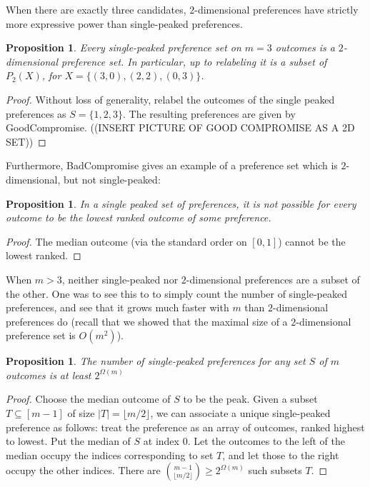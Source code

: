 \documentclass[12pt]{article}
\newtheorem{proposition}[theorem]{Proposition}
\newcommand{\1}[1]{\mathds{1}[{#1}]}
\begin{document}
  When there are exactly three candidates, $2$-dimensional
  preferences have strictly more expressive power than
  single-peaked preferences.
  \begin{proposition}
    Every single-peaked preference set on $m=3$ outcomes
    is a $2$-dimensional preference set. In particular,
    up to relabeling it is a subset of $P_2(X)$, for
    $X = \{ (3,0), (2,2), (0,3) \}$.
  \end{proposition}
  \begin{proof}
    Without loss of generality, relabel the outcomes
    of the single peaked preferences as $S = \{1,2,3\}$.
    The resulting preferences are given by {\sc GoodCompromise}.
    ((INSERT PICTURE OF GOOD COMPROMISE AS A 2D SET))
  \end{proof}
  Furthermore, {\sc BadCompromise} gives an example of a preference set
  which is $2$-dimensional, but not single-peaked:
  \begin{proposition} \label{prop:noLeastFavorite}
    In a single peaked set of preferences, it is not possible
    for every outcome to be the lowest ranked outcome of some preference.
  \end{proposition}
  \begin{proof}
    The median outcome (via the standard order on $[0,1]$)
    cannot be the lowest ranked.
  \end{proof}

  When $m>3$, neither single-peaked nor $2$-dimensional preferences
  are a subset of the other. One was to see this to to simply
  count the number of single-peaked preferences, and see that it
  grows much faster with $m$ than $2$-dimensional preferences do
  (recall that we showed that the maximal size of a $2$-dimensional
  preference set is $O(m^2)$).
  \begin{proposition}
    The number of single-peaked preferences for any set $S$ of $m$ outcomes
    is at least $2^{\Omega(m)}$
  \end{proposition}
  \begin{proof}
    Choose the median outcome of $S$ to be the peak.
    Given a subset $T\subseteq [m-1]$ of size $|T| = \lfloor m/2\rfloor$,
    we can associate a
    unique single-peaked preference as follows:
    treat the preference as an array of outcomes, ranked highest to lowest.
    Put the median of $S$ at index $0$.
    Let the outcomes to the left of the median occupy the indices corresponding
    to set $T$, and let those to the right occupy the other indices.
    There are ${m-1 \choose \lfloor m/2\rfloor } \ge 2^{\Omega(m)}$ such
    subsets $T$.
  \end{proof}
\end{document}
